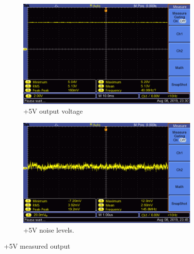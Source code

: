 \begin{figure}[h] 
 \centering
 
    \begin{subfigure}[]{0.49\linewidth}
        \centering
        \includegraphics[width=1.\linewidth,clip,trim = 0cm 0cm 2.5cm 0cm]{./Figures/5v_test}
        \caption{+5V output voltage}
        \label{fig:5v_output_measurement}
    \end{subfigure}
    \begin{subfigure}[]{0.49\linewidth}
        \centering
        \includegraphics[width=1.\linewidth,clip,trim = 0cm 0cm 2.5cm 0cm]{./Figures/5v_noise_test}
        \caption{+5V noise levels.}
        \label{fig:5v_noise_measurement}
    \end{subfigure}
    
\caption{+5V measured output}
\label{fig:5v_measurement_box}
\end{figure}








